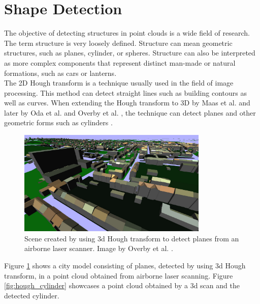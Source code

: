 \section {Shape Detection}
\label{sec:related_work_shape detection}

The objective of detecting structures in point clouds is a wide field of research. The term structure is very loosely defined. Structure can mean geometric structures, such as planes, cylinder, or spheres. Structure can also be interpreted as more complex components that represent distinct man-made or natural formations, such as cars or lanterns. 
\\
The 2D Hough transform \cite{hough1962method} is a technique usually used in the field of image processing. This method can detect straight lines such as building contours as well as curves. When extending the Hough transform to 3D by Maas et al. \cite{maas1999two} and later by Oda et al. \cite{oda2004automatic} and Overby et al. \cite{overby2004automatic}, the technique can detect planes and other geometric forms such as cylinders \cite{rabbani2005efficient}. 

\begin{figure}
    \centering
    \includegraphics[width=0.81\textwidth]{Related_Work/hough_planes.png}%
    \caption[Scene created by using 3d Hough transform to detect planes from an airborne laser scanner]
		{Scene created by using 3d Hough transform to detect planes from an airborne laser scanner. Image by Overby et al. \cite{overby2004automatic}.}
    \label{fig:hough_planes}
\end{figure}

Figure \ref{fig:hough_planes} shows a city model consisting of planes, detected by using 3d Hough transform, in a point cloud obtained from airborne laser scanning. Figure \ref{fig:hough_cylinder} showcases a point cloud obtained by a 3d scan and the detected cylinder. 


